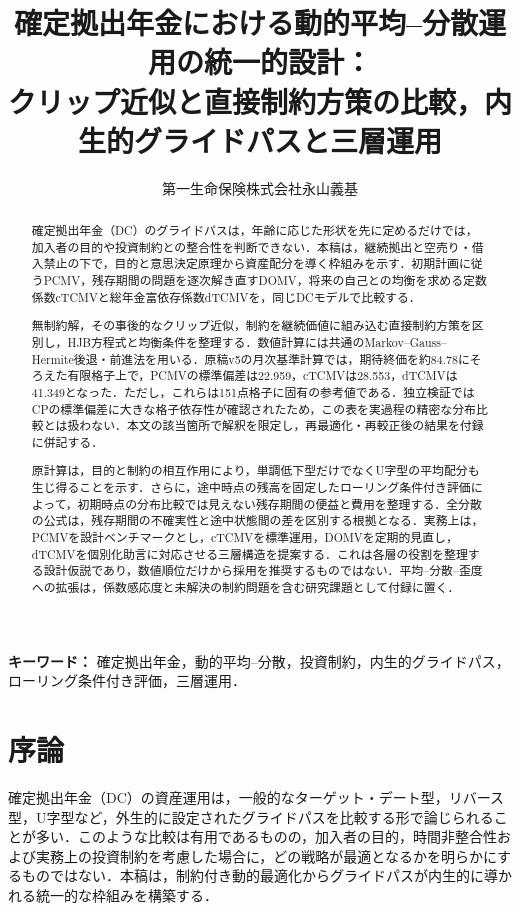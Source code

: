 \documentclass[10pt,a4paper]{article}
\title{確定拠出年金における動的平均--分散運用の統一的設計：\\
\large クリップ近似と直接制約方策の比較，内生的グライドパスと三層運用}
\author{第一生命保険株式会社\quad 永山義基}\date{}
\theoremstyle{plain}
\theoremstyle{definition}
\begin{document}
\maketitle
\begin{abstract}
確定拠出年金（DC）のグライドパスは，年齢に応じた形状を先に定めるだけでは，加入者の目的や投資制約との整合性を判断できない．本稿は，継続拠出と空売り・借入禁止の下で，目的と意思決定原理から資産配分を導く枠組みを示す．初期計画に従うPCMV，残存期間の問題を逐次解き直すDOMV，将来の自己との均衡を求める定数係数cTCMVと総年金富依存係数dTCMVを，同じDCモデルで比較する．

無制約解，その事後的なクリップ近似，制約を継続価値に組み込む直接制約方策を区別し，HJB方程式と均衡条件を整理する．数値計算には共通のMarkov--Gauss--Hermite後退・前進法を用いる．原稿v5の月次基準計算では，期待終価を約84.78にそろえた有限格子上で，PCMVの標準偏差は22.959，cTCMVは28.553，dTCMVは41.349となった．ただし，これらは151点格子に固有の参考値である．独立検証ではCPの標準偏差に大きな格子依存性が確認されたため，この表を実過程の精密な分布比較とは扱わない．本文の該当箇所で解釈を限定し，再最適化・再較正後の結果を付録に併記する．

原計算は，目的と制約の相互作用により，単調低下型だけでなくU字型の平均配分も生じ得ることを示す．さらに，途中時点の残高を固定したローリング条件付き評価によって，初期時点の分布比較では見えない残存期間の便益と費用を整理する．全分散の公式は，残存期間の不確実性と途中状態間の差を区別する根拠となる．実務上は，PCMVを設計ベンチマークとし，cTCMVを標準運用，DOMVを定期的見直し，dTCMVを個別化助言に対応させる三層構造を提案する．これは各層の役割を整理する設計仮説であり，数値順位だけから採用を推奨するものではない．平均--分散--歪度への拡張は，係数感応度と未解決の制約問題を含む研究課題として付録に置く．
\end{abstract}
\noindent\textbf{キーワード：} 確定拠出年金，動的平均--分散，投資制約，内生的グライドパス，ローリング条件付き評価，三層運用．
\clearpage\setcounter{tocdepth}{1}\tableofcontents\clearpage
\section{序論}
\label{sec:introduction}

確定拠出年金（DC）の資産運用は，一般的なターゲット・デート型，リバース型，U字型など，外生的に設定されたグライドパスを比較する形で論じられることが多い．このような比較は有用であるものの，加入者の目的，時間非整合性および実務上の投資制約を考慮した場合に，どの戦略が最適となるかを明らかにするものではない．本稿は，制約付き動的最適化からグライドパスが内生的に導かれる統一的な枠組みを構築する．
\end{document}
